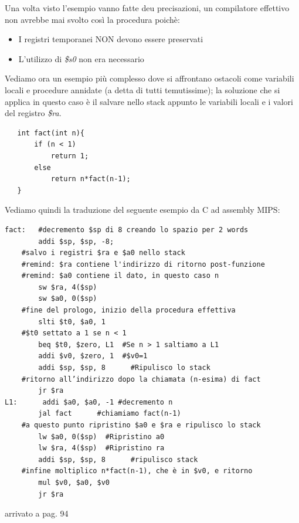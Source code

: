 \documentclass[class=book, crop=false]{standalone}
\begin{document}
Una volta visto l'esempio vanno fatte deu precisazioni, un compilatore effettivo non avrebbe mai svolto così la procedura poichè:
\begin{itemize}[nolistsep, noitemsep]
	\item I registri temporanei NON devono essere preservati
	\item L'utilizzo di \emph{\$s0} non era necessario
\end{itemize}

Vediamo ora un esempio più complesso dove si affrontano ostacoli come variabili locali e procedure annidate (a detta di tutti temutissime); la soluzione che si applica in questo caso è il salvare nello stack appunto le variabili locali e i valori del registro \emph{\$ra}.

\begin{verbatim}
   int fact(int n){
	   if (n < 1)
		   return 1;
	   else
		   return n*fact(n-1);
   }
\end{verbatim}

Vediamo quindi la traduzione del seguente esempio da C ad assembly MIPS:

\begin{verbatim}
fact:   #decremento $sp di 8 creando lo spazio per 2 words
		addi $sp, $sp, -8;
	#salvo i registri $ra e $a0 nello stack
	#remind: $ra contiene l'indirizzo di ritorno post-funzione
	#remind: $a0 contiene il dato, in questo caso n
		sw $ra, 4($sp)
		sw $a0, 0($sp)
	#fine del prologo, inizio della procedura effettiva
		slti $t0, $a0, 1
	#$t0 settato a 1 se n < 1
		beq $t0, $zero, L1	#Se n > 1 saltiamo a L1
		addi $v0, $zero, 1	#$v0=1
		addi $sp, $sp, 8	  #Ripulisco lo stack
	#ritorno all’indirizzo dopo la chiamata (n-esima) di fact
		jr $ra
L1:	     addi $a0, $a0, -1 #decremento n
		jal fact	  #chiamiamo fact(n-1)
	#a questo punto ripristino $a0 e $ra e ripulisco lo stack
		lw $a0, 0($sp)	#Ripristino a0
		lw $ra, 4($sp)	#Ripristino ra
		addi $sp, $sp, 8      #ripulisco stack
	#infine moltiplico n*fact(n-1), che è in $v0, e ritorno
		mul $v0, $a0, $v0
		jr $ra
\end{verbatim}

arrivato a pag. 94
\end{document}
